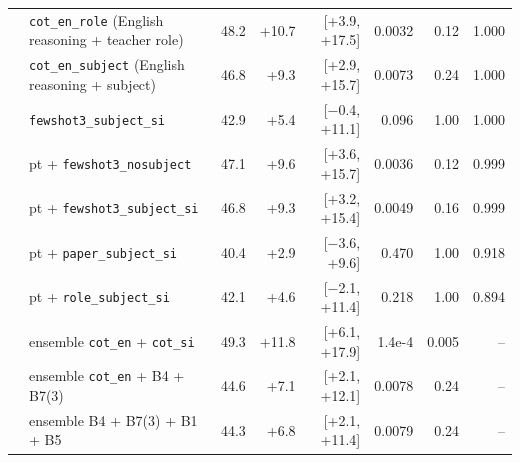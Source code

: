 \documentclass[10pt,a4paper]{article}
\newcommand{\cond}[1]{\texttt{#1}}
\begin{document}
{\begin{longtable}{p{0.5ex}lrrrrrr}
& \cond{cot\_en\_role} (English reasoning + teacher role) & 48.2 & +10.7 & [+3.9, +17.5] & 0.0032 & 0.12 & 1.000\\
& \cond{cot\_en\_subject} (English reasoning + subject) & 46.8 & +9.3 & [+2.9, +15.7] & 0.0073 & 0.24 & 1.000\\
& \cond{fewshot3\_subject\_si} & 42.9 & +5.4 & [$-$0.4, +11.1] & 0.096 & 1.00 & 1.000\\
& pt + \cond{fewshot3\_nosubject} & 47.1 & +9.6 & [+3.6, +15.7] & 0.0036 & 0.12 & 0.999\\
& pt + \cond{fewshot3\_subject\_si} & 46.8 & +9.3 & [+3.2, +15.4] & 0.0049 & 0.16 & 0.999\\
& pt + \cond{paper\_subject\_si} & 40.4 & +2.9 & [$-$3.6, +9.6] & 0.470 & 1.00 & 0.918\\
& pt + \cond{role\_subject\_si} & 42.1 & +4.6 & [$-$2.1, +11.4] & 0.218 & 1.00 & 0.894\\
& ensemble \cond{cot\_en} + \cond{cot\_si} & 49.3 & +11.8 & [+6.1, +17.9] & 1.4e-4 & 0.005 & --\\
& ensemble \cond{cot\_en} + B4 + B7(3) & 44.6 & +7.1 & [+2.1, +12.1] & 0.0078 & 0.24 & --\\
& ensemble B4 + B7(3) + B1 + B5 & 44.3 & +6.8 & [+2.1, +11.4] & 0.0079 & 0.24 & --\\
\bottomrule
\end{longtable}}
\end{document}
